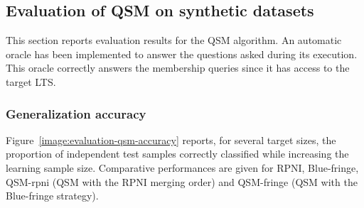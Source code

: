 \subsection{Evaluation of QSM on synthetic datasets\label{subsection:evaluation-synthetic-qsm}}

This section reports evaluation results for the QSM algorithm. An automatic oracle has been implemented to answer the questions asked during its execution. This oracle correctly answers the membership queries since it has access to the target LTS.

\subsubsection*{Generalization accuracy}

Figure~\ref{image:evaluation-qsm-accuracy} reports, for several target sizes, the proportion of independent test samples correctly classified while increasing the learning sample size. Comparative performances are given for RPNI, Blue-fringe, QSM-rpni (QSM with the RPNI merging order) and QSM-fringe (QSM with the Blue-fringe strategy).

